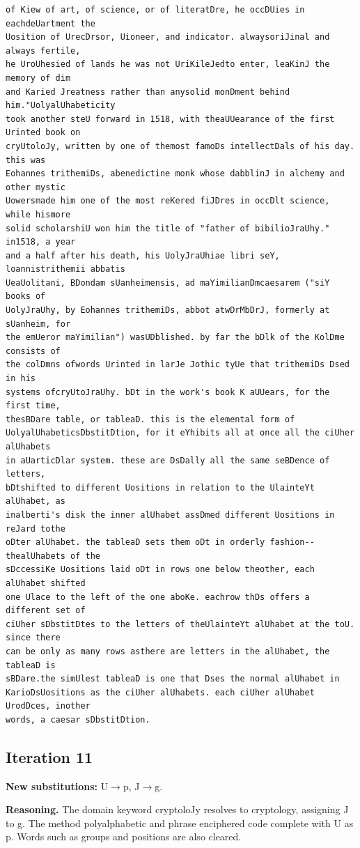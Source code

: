 \documentclass[12pt,a4paper]{article}
\begin{document}
\begin{lstlisting}[caption={Complete text after iteration 10}, label={lst:iter10}]
of Kiew of art, of science, or of literatDre, he occDUies in eachdeUartment the
Uosition of UrecDrsor, Uioneer, and indicator. alwaysoriJinal and always fertile,
he UroUhesied of lands he was not UriKileJedto enter, leaKinJ the memory of dim
and Karied Jreatness rather than anysolid monDment behind him."UolyalUhabeticity
took another steU forward in 1518, with theaUUearance of the first Urinted book on
cryUtoloJy, written by one of themost famoDs intellectDals of his day. this was
Eohannes trithemiDs, abenedictine monk whose dabblinJ in alchemy and other mystic
Uowersmade him one of the most reKered fiJDres in occDlt science, while hismore
solid scholarshiU won him the title of "father of bibilioJraUhy." in1518, a year
and a half after his death, his UolyJraUhiae libri seY, loannistrithemii abbatis
UeaUolitani, BDondam sUanheimensis, ad maYimilianDmcaesarem ("siY books of
UolyJraUhy, by Eohannes trithemiDs, abbot atwDrMbDrJ, formerly at sUanheim, for
the emUeror maYimilian") wasUDblished. by far the bDlk of the KolDme consists of
the colDmns ofwords Urinted in larJe Jothic tyUe that trithemiDs Dsed in his
systems ofcryUtoJraUhy. bDt in the work's book K aUUears, for the first time,
thesBDare table, or tableaD. this is the elemental form of
UolyalUhabeticsDbstitDtion, for it eYhibits all at once all the ciUher alUhabets
in aUarticDlar system. these are DsDally all the same seBDence of letters,
bDtshifted to different Uositions in relation to the UlainteYt alUhabet, as
inalberti's disk the inner alUhabet assDmed different Uositions in reJard tothe
oDter alUhabet. the tableaD sets them oDt in orderly fashion--thealUhabets of the
sDccessiKe Uositions laid oDt in rows one below theother, each alUhabet shifted
one Ulace to the left of the one aboKe. eachrow thDs offers a different set of
ciUher sDbstitDtes to the letters of theUlainteYt alUhabet at the toU. since there
can be only as many rows asthere are letters in the alUhabet, the tableaD is
sBDare.the simUlest tableaD is one that Dses the normal alUhabet in
KarioDsUositions as the ciUher alUhabets. each ciUher alUhabet UrodDces, inother
words, a caesar sDbstitDtion.
\end{lstlisting}

\clearpage
\subsection{Iteration 11}
\textbf{New substitutions:} U$\to$p, J$\to$g.

\textbf{Reasoning.} The domain keyword cryptoloJy resolves to cryptology, assigning J to g. The method polyalphabetic and phrase enciphered code complete with U as p. Words such as groups and positions are also cleared.
\end{document}
